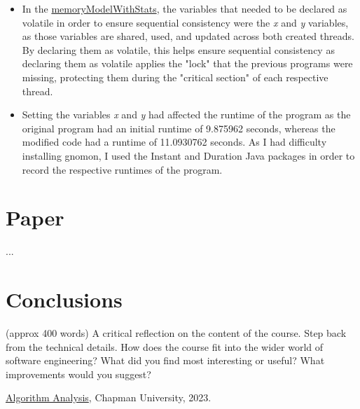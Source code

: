 \documentclass{article}
\theoremstyle{theorem}
\theoremstyle{definition}
\theoremstyle{remark}
\begin{document}
\begin{itemize}
    \item In the \href{https://www.online-java.com/yFkZ4HqfRG}{memoryModelWithStats}, the variables that needed to be declared as volatile in order to ensure sequential consistency were the \textit{x} and \textit{y} variables, as those variables are shared, used, and updated across both created threads. By declaring them as volatile, this helps ensure sequential consistency as declaring them as volatile applies the "lock" that the previous programs were missing, protecting them during the "critical section" of each respective thread.
    \item Setting the variables \textit{x} and \textit{y} had affected the runtime of the program as the original program had an initial runtime of 9.875962 seconds, whereas the modified code had a runtime of 11.0930762 seconds. As I had difficulty installing gnomon, I used the Instant and Duration Java packages in order to record the respective runtimes of the program.
\end{itemize}
\section{Paper}

...

\section{Conclusions}\label{conclusions}

(approx 400 words) A critical reflection on the content of the course. Step back from the technical details. How does the course fit into the wider world of software engineering? What did you find most interesting or useful? What improvements would you suggest?

\begin{thebibliography}{99}
 \href{https://github.com/alexhkurz/algorithm-analysis-2023}{Algorithm Analysis}, Chapman University, 2023.
\end{thebibliography}
\end{document}
